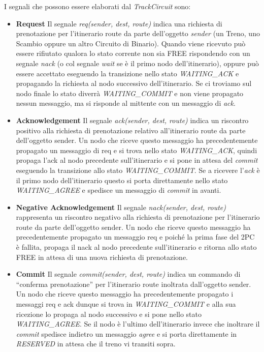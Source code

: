 I segnali che possono essere elaborati dal \textit{TrackCircuit} sono:
\begin{itemize}
\item \textbf{Request} Il segnale \textit{req(sender, dest, route)} indica una
richiesta di prenotazione per l’itinerario route da parte dell’oggetto
\textit{sender} (un Treno, uno Scambio oppure un altro Circuito di Binario).
Quando viene ricevuto può essere rifiutato qualora lo stato corrente non sia
FREE rispondendo con un segnale \textit{nack} (o col segnale \textit{wait} se è
il primo nodo dell’itinerario), oppure può essere accettato
eseguendo la transizione nello stato \textit{WAITING\_ACK} e propagando la
richiesta al nodo successivo dell’itinerario. Se ci troviamo sul nodo finale lo
stato diverrà \textit{WAITING\_COMMIT} e non viene propagato nessun messaggio,
ma si risponde al mittente con un messaggio di \textit{ack}.

\item \textbf{Acknowledgement} Il segnale \textit{ack(sender, dest, route)} indica un
riscontro positivo alla richiesta di prenotazione relativo all’itinerario route da parte
dell’oggetto sender. Un nodo che riceve questo messaggio ha precedentemente
propagato un messaggio di req e si trova nello stato \textit{WAITING\_ACK},
quindi propaga l’ack al nodo precedente sull’itinerario e si pone in attesa del
\textit{commit} eseguendo la transizione allo stato \textit{WAITING\_COMMIT}. Se
a ricevere l’\textit{ack} è il primo nodo dell’itinerario questo si porta
direttamente nello stato \textit{WAITING\_AGREE} e spedisce un messaggio di
\textit{commit} in avanti.

\item \textbf{Negative Acknowledgement} Il segnale \textit{nack(sender, dest, route)}
rappresenta un riscontro negativo alla richiesta di prenotazione per l’itinerario route da parte
dell’oggetto sender. Un nodo che riceve questo messaggio ha precedentemente
propagato un messaggio req e poiché la prima fase del 2PC è fallita, propaga il
nack al nodo precedente sull’itinerario e ritorna allo stato FREE in attesa di una
nuova richiesta di prenotazione.

\item \textbf{Commit} Il segnale \textit{commit(sender, dest, route)} indica un
commando di “conferma prenotazione” per l’itinerario route inoltrata dall’oggetto sender. Un nodo
che riceve questo messaggio ha precedentemente propagato i messaggi req e ack
dunque si trova in \textit{WAITING\_COMMIT} e alla sua ricezione lo propaga al
nodo successivo e si pone nello stato \textit{WAITING\_AGREE}. Se il nodo è
l’ultimo dell’itinerario invece che inoltrare il \textit{commit} spedisce
indietro un messaggio \textit{agree} e si porta direttamente in
\textit{RESERVED} in attesa che il treno vi transiti sopra.


\end{itemize}
